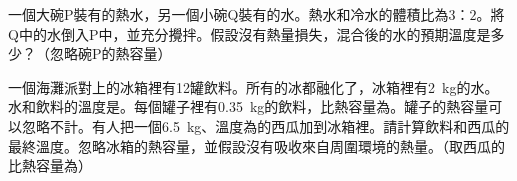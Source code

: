 {
    一個大碗P裝有的熱水，另一個小碗Q裝有的水。熱水和冷水的體積比為$3：2$。將Q中的水倒入P中，並充分攪拌。假設沒有熱量損失，混合後的水的預期溫度是多少？（忽略碗P的熱容量）
    \begin{choices}
        \choice {}
        \choice {}
        \choice {}
        \CorrectChoice {}
    \end{choices}
}{}

{
    一個海灘派對上的冰箱裡有12罐飲料。所有的冰都融化了，冰箱裡有\qty{2}{kg}的水。水和飲料的溫度是。每個罐子裡有\qty{0.35}{kg}的飲料，比熱容量為。罐子的熱容量可以忽略不計。有人把一個\qty{6.5}{kg}、溫度為的西瓜加到冰箱裡。請計算飲料和西瓜的最終溫度。忽略冰箱的熱容量，並假設沒有吸收來自周圍環境的熱量。（取西瓜的比熱容量為）
    \begin{choices}
        \choice {}
        \CorrectChoice {}
        \choice {}
        \choice {}
    \end{choices}
}{}